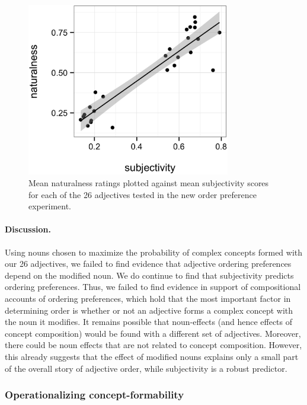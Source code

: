 \documentclass[12pt]{article}
\newcommand{\jd}[1]{\textcolor{red}{[jd: #1]}}
\begin{document}
\renewcommand\thefigure{A.\arabic{figure}}
\begin{figure}
	\centering\includegraphics[width=3.5in]{plots/naturalness-subjectivity-new-nouns.eps}
	\caption{Mean naturalness ratings plotted against mean subjectivity scores for each of the 26 adjectives tested in the new order preference experiment.}\label{fig:subjectivity}
\end{figure}

\paragraph{Discussion.} Using nouns chosen to maximize the probability of complex concepts formed with our 26 adjectives, we failed to find evidence that adjective ordering preferences depend on the modified noun. We do continue to find that subjectivity predicts ordering preferences. Thus, we failed to find evidence in support of compositional accounts of ordering preferences, which hold that the most important factor in determining order is whether or not an adjective forms a complex concept with the noun it modifies. 
It remains possible that noun-effects (and hence effects of concept composition)  %
would be found with a different set of adjectives. Moreover, there could be noun effects that are not related to concept composition. 
However, this already suggests that the effect of modified nouns explains only a small part of the overall story of adjective order, while subjectivity is a robust predictor.



\subsubsection{Operationalizing concept-formability} \label{operationalize}
\end{document}
